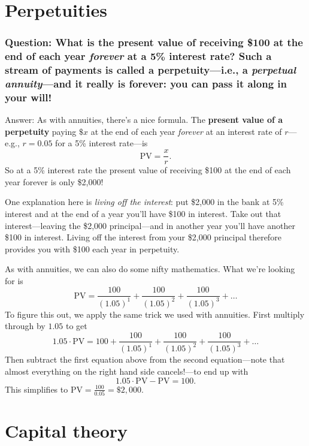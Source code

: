\section{Perpetuities}

\subsubsection{Question\rm : What is the present value of receiving \$100 at the end of each year \emph{forever} at a 5\% interest rate? Such a stream of payments is called a \textbf{perpetuity}---i.e., a \emph{perpetual annuity}---and it really is forever: you can pass it along in your will!}

Answer: As with annuities, there's a nice formula. The \textbf{present value of a perpetuity} paying $\$x$ at the end of each year \emph{forever} at an interest rate of $r$---e.g., $r=0.05$ for a 5\% interest rate---is
\[
\mbox{PV}=\frac{x}{r}.
\]
So at a 5\% interest rate the present value of receiving \$100 at the end of each year forever is only \$2,000!

One explanation here is \emph{living off the interest}: put \$2,000 in the bank at 5\% interest and at the end of a year you'll have \$100 in interest. Take out that interest---leaving the \$2,000 principal---and in another year you'll have another \$100 in interest. Living off the interest from your \$2,000 principal therefore provides you with \$100 each year in perpetuity.

As with annuities, we can also do some nifty mathematics. What we're looking for is
\[
\mbox{PV}=\frac{100}{(1.05)^1}+\frac{100}{(1.05)^2}+\frac{100}{(1.05)^3}+\ldots
\]
%
To figure this out, we apply the same trick we used with annuities. First multiply through by $1.05$ to get
\[
1.05 \cdot
\mbox{PV}=100+\frac{100}{(1.05)^1}+\frac{100}{(1.05)^2}+\frac{100}{(1.05)^3}+\ldots
\]
%
Then subtract the first equation above from the second equation---note that almost everything on the right hand side cancels!---to end up with
\[
1.05 \cdot \mbox{PV} - \mbox{PV}=100.
\]
%
This simplifies to $\displaystyle \mbox{PV}=\frac{100}{0.05}=\$2,000.$




\section{Capital theory}
\label{1capital}

